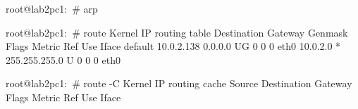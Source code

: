 root@lab2pc1:~# arp


root@lab2pc1:~# route
Kernel IP routing table
Destination     Gateway         Genmask         Flags Metric Ref    Use Iface
default         10.0.2.138      0.0.0.0         UG    0      0        0 eth0
10.0.2.0        *               255.255.255.0   U     0      0        0 eth0


root@lab2pc1:~# route -C
Kernel IP routing cache
Source          Destination     Gateway         Flags Metric Ref    Use Iface
